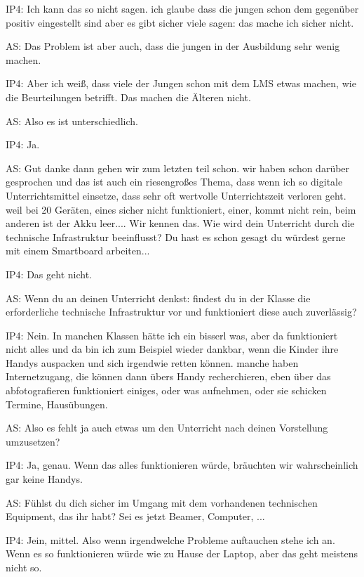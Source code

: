 \documentclass[fontsize=11pt,paper=a4]{scrbook}
\begin{document}
{\begin{itemize*}
\item[IP4:]
Ich kann das so nicht sagen. ich glaube dass die jungen schon dem
gegenüber positiv eingestellt sind aber es gibt sicher viele sagen: das mache
ich sicher nicht.
\item[AS:] Das Problem ist aber auch, dass die
jungen in der Ausbildung sehr wenig
machen.
\item[IP4:] Aber ich weiß, dass viele der Jungen schon mit dem LMS etwas machen, wie die Beurteilungen betrifft. Das machen die Älteren nicht.
\item[AS:] Also es ist unterschiedlich.
\item[IP4:] Ja.
\item[AS:] Gut danke dann gehen wir zum
letzten teil schon. wir haben schon
darüber gesprochen und das ist auch ein
riesengroßes Thema,  dass wenn ich so digitale Unterrichtsmittel einsetze, dass sehr oft
wertvolle Unterrichtszeit verloren geht.
weil bei 20 Geräten, eines sicher nicht funktioniert, einer, kommt nicht rein, beim anderen ist der Akku
leer.... Wir kennen das.
Wie wird dein Unterricht durch die technische
Infrastruktur beeinflusst? Du hast es
schon gesagt du würdest gerne mit einem Smartboard arbeiten...
\item[IP4:] Das geht nicht.
\item[AS:] Wenn du an deinen
Unterricht denkst: findest du in der
Klasse die erforderliche technische
Infrastruktur vor und funktioniert diese
auch zuverlässig?
\item[IP4:] Nein. In manchen Klassen hätte ich ein bisserl
was, aber da funktioniert nicht alles und da bin
ich zum Beispiel wieder dankbar, wenn die Kinder ihre Handys auspacken und sich irgendwie retten können. manche
haben Internetzugang, die können dann übers Handy recherchieren, eben über
das abfotografieren funktioniert einiges, oder was aufnehmen, oder sie schicken Termine, Hausübungen.
\item[AS:] Also es fehlt ja auch etwas um den 
Unterricht nach deinen Vorstellung
umzusetzen?
\item[IP4:] Ja, genau. Wenn das alles funktionieren würde, bräuchten wir wahrscheinlich gar keine Handys.
\item[AS:] Fühlst du dich sicher im
Umgang mit dem vorhandenen technischen
Equipment, das ihr habt? Sei es jetzt Beamer, Computer, ...
\item[IP4:] Jein, mittel. Also wenn irgendwelche Probleme auftauchen stehe ich an. Wenn es so funktionieren würde wie zu Hause der Laptop, aber das geht meistens nicht so.

\end{itemize*}}
\end{document}
